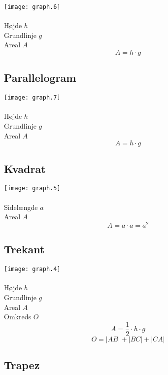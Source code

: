 \documentclass[11pt,a5paper,fleqn,leqno]{book}
\begin{document}
\texttt{[image: graph.6]}
\\
\\
Højde $h$ \\
Grundlinje $g$ \\
Areal $A$
\begin{equation} \label{eq:areal_rektangle}
A = h \cdot g
\end{equation}

\subsection{Parallelogram}

\texttt{[image: graph.7]}
\\
\\
Højde $h$ \\
Grundlinje $g$ \\
Areal $A$
\begin{equation}
A = h \cdot g
\end{equation}

\subsection{Kvadrat}

\texttt{[image: graph.5]}
\\
\\
Sidelængde $a$ \\
Areal $A$
\begin{equation}
A = a \cdot a = a^2
\end{equation}

\subsection{Trekant}

\texttt{[image: graph.4]}
\\
\\
Højde $h$ \\
Grundlinje $g$ \\
Areal $A$ \\
Omkreds $O$
\begin{equation} \label{eq:areal_trekant}
A = \frac{1}{2} \cdot h \cdot g
\end{equation}
\begin{equation}
O = |AB| + |BC| + |CA|
\end{equation}

\subsection{Trapez}
\end{document}

